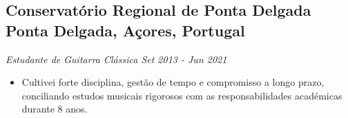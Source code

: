 \documentclass[a4paper,10pt]{article}
\begin{document}
    \subsection*{\texorpdfstring{
            \textbf{Conservatório Regional de Ponta Delgada} \hfill Ponta Delgada, Açores, Portugal
        }{
            Conservatório Regional de Ponta Delgada -- Ponta Delgada, Açores, Portugal
        }}
    \textit{Estudante de Guitarra Clássica \hfill Set 2013 - Jun 2021}
        \begin{itemize}
            \item Cultivei forte disciplina, gestão de tempo e compromisso a longo prazo, conciliando estudos musicais rigorosos com as responsabilidades académicas durante 8 anos.
        \end{itemize}
\end{document}
